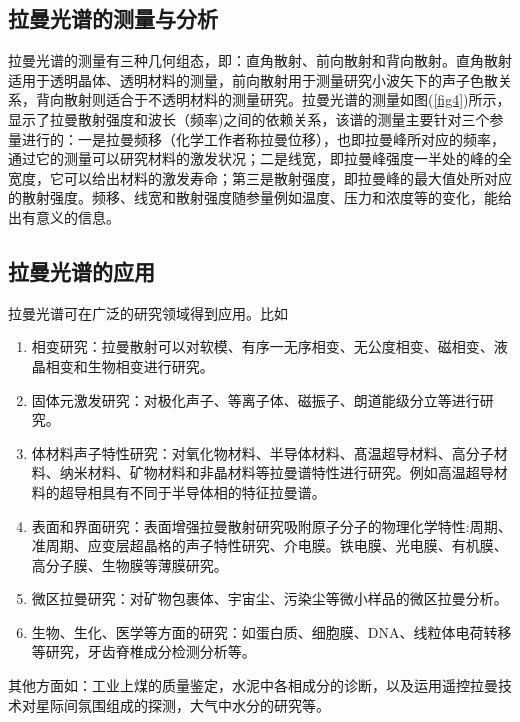 \documentclass[a4paper]{article}
\begin{document}
\subsection{拉曼光谱的测量与分析}
拉曼光谱的测量有三种几何组态，即：直角散射、前向散射和背向散射。直角散射适用于透明晶体、透明材料的测量，前向散射用于测量研究小波矢下的声子色散关系，背向散射则适合于不透明材料的测量研究。拉曼光谱的测量如图(\ref{fig4})所示，显示了拉曼散射强度和波长（频率)之间的依赖关系，该谱的测量主要针对三个参量进行的：一是拉曼频移（化学工作者称拉曼位移），也即拉曼峰所对应的频率，通过它的测量可以研究材料的激发状况；二是线宽，即拉曼峰强度一半处的峰的全宽度，它可以给出材料的激发寿命；第三是散射强度，即拉曼峰的最大值处所对应的散射强度。频移、线宽和散射强度随参量例如温度、压力和浓度等的变化，能给出有意义的信息。
\subsection{拉曼光谱的应用}
拉曼光谱可在广泛的研究领域得到应用。比如
\begin{enumerate}
\item 相变研究：拉曼散射可以对软模、有序一无序相变、无公度相变、磁相变、液晶相变和生物相变进行研究。
\item 固体元激发研究：对极化声子、等离子体、磁振子、朗道能级分立等进行研究。
\item 体材料声子特性研究：对氧化物材料、半导体材料、髙温超导材料、高分子材料、纳米材料、矿物材料和非晶材料等拉曼谱特性进行研究。例如高温超导材料的超导相具有不同于半导体相的特征拉曼谱。
\item 表面和界面研究：表面增强拉曼散射研究吸附原子分子的物理化学特性:周期、准周期、应变层超晶格的声子特性研究、介电膜。铁电膜、光电膜、有机膜、高分子膜、生物膜等薄膜研究。
\item 微区拉曼研究：对矿物包裹体、宇宙尘、污染尘等微小样品的微区拉曼分析。
\item 生物、生化、医学等方面的研究：如蛋白质、细胞膜、DNA、线粒体电荷转移等研究，牙齿脊椎成分检测分析等。
\end{enumerate}
其他方面如：工业上煤的质量鉴定，水泥中各相成分的诊断，以及运用遥控拉曼技术对星际间氛围组成的探测，大气中水分的研究等。
\end{document}
